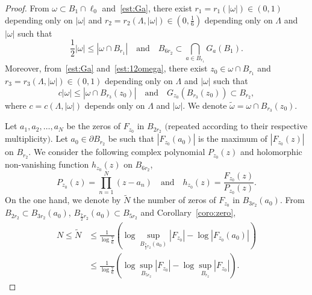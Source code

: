 \documentclass[a4paper,reqno]{amsart}
\theoremstyle{definition}
\numberwithin{equation}{section}
\begin{document}
\begin{proof}
From $\omega \subset B_{1}\cap \ell_{0}$ and~\eqref{est:Ga}, there exist $r_{1}=r_{1}(|\omega|)\in (0,1)$ depending only on $|\omega|$ and $r_{2}=r_{2}(\Lambda,|\omega|)\in (0,\frac{1}{6})$ depending only on $\Lambda$ and $|\omega|$ such that 
\begin{equation}\label{est:12omega}
    \frac{1}{2}|\omega|\le \left|\omega\cap B_{r_{1}}\right|\quad \mbox{and}\quad 
    B_{6r_{2}}\subset \bigcap_{a\in B_{r_{1}}}G_{a}\left(B_{1}\right).
\end{equation}
Moreover, from~\eqref{est:Ga} and~\eqref{est:12omega}, there exist $z_{0}\in \omega\cap B_{r_{1}}$ and $r_{3}=r_{3}(\Lambda,|\omega|)\in (0,1)$ depending only on $\Lambda$ and $|\omega|$ such that 
\begin{equation}\label{est:omega}
    c|\omega|\le |\omega\cap B_{r_{3}}(z_{0})|\quad \mbox{and}\quad 
    G_{z_{0}}\left(B_{r_{3}}(z_{0})\right)\subset B_{r_{2}},
\end{equation}
where $c=c(\Lambda,|\omega|)$ depends only on $\Lambda$ and $|\omega|$. We denote $\widetilde{\omega}=\omega\cap B_{r_{3}}(z_{0})$.

Let $a_{1},a_{2},\dots,a_{N}$ be the zeros of $F_{z_{0}}$ in $B_{2r_{2}}$
$($repeated according to their respective multiplicity$)$. Let $a_{0}\in \partial B_{r_{2}}$ be such that $|F_{z_{0}}(a_{0})|$ is the maximum of $|F_{z_{0}}(z)|$
 on $B_{r_{2}}$.
We consider the following complex polynomial $P_{z_{0}}(z)$ and holomorphic non-vanishing function $h_{z_{0}}(z)$ on $B_{6r_{2}}$,
\begin{equation*}
    P_{z_{0}}(z)=\prod_{n=1}^{N}(z-a_{n})\quad \mbox{and}\quad 
    h_{z_{0}}(z)=\frac{F_{z_{0}}(z)}{P_{z_{0}}(z)}.
\end{equation*}
On the one hand, we denote by $\widetilde{N}$ the number of zeros of $F_{z_{0}}$ in $B_{3r_{2}}(a_{0})$. From $B_{2r_{2}}\subset B_{3r_{2}}(a_{0})$,
$B_{\frac{7}{2}r_{2}}(a_{0})\subset B_{5r_{2}}$ and 
Corollary~\ref{coro:zero},
\begin{equation}\label{est:N}
\begin{aligned}
    N\le \widetilde{N}
    &\le \frac{1}{\log \frac{7}{6}}\left(\log \sup_{B_{\frac{7}{2}r_{2}}(a_{0})}|F_{z_{0}}|-\log |F_{z_{0}}(a_{0})|\right)\\
    &\le \frac{1}{\log \frac{7}{6}}
    \left(\log \sup_{B_{5r_{2}}}|F_{z_{0}}|-\log\sup_{B_{r_{2}}} |F_{z_{0}}|\right).
    \end{aligned}
\end{equation}


\end{proof}
\end{document}
